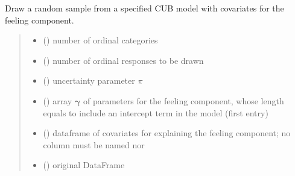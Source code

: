 \documentclass[letterpaper,10pt,english]{sphinxmanual}
\begin{document}

\begin{fulllineitems}
\label{\detokenize{cubmods:cubmods.cub_0w.draw}}
\pysigstartsignatures
{}
\pysigstopsignatures
\sphinxAtStartPar
Draw a random sample from a specified CUB model with covariates for
the feeling component.
\begin{quote}\begin{description}
\begin{itemize}
\item {} 
\sphinxAtStartPar
{} () \textendash{} number of ordinal categories

\item {} 
\sphinxAtStartPar
{} () \textendash{} number of ordinal responses to be drawn

\item {} 
\sphinxAtStartPar
{} () \textendash{} uncertainty parameter \(\pi\)

\item {} 
\sphinxAtStartPar
{} () \textendash{} array \(\pmb \gamma\) of parameters for the feeling component, whose length equals 
 to include an intercept term in the model (first entry)

\item {} 
\sphinxAtStartPar
{} () \textendash{} dataframe of covariates for explaining the feeling component;
no column must be named  nor 

\item {} 
\sphinxAtStartPar
{} () \textendash{} original DataFrame


\end{itemize}
\end{description}
\end{quote}
\end{fulllineitems}
\end{document}
